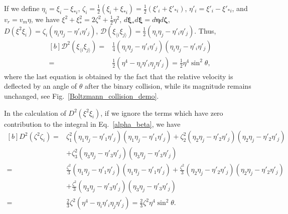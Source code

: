 If we define $\eta_i=\xi_i-\xi_{\ast {i}}$, 
$\zeta_i=\frac{1}{2}(\xi_i+\xi_{\ast {i}})=\frac{1}{2}(\xi'_i+\xi'_{\ast {i}})$,  $\eta'_i=\xi'_i-\xi'_{\ast {i}}$, 
 and $v_r=v_m\eta$, we have $\xi^2+\xi^2_{\ast}=2\zeta^2+\frac{1}{2}\eta^2$, ${d\bm{\xi}_\ast}d\bm{\xi}=d\bm{\eta}d\bm{\zeta}$,
${D}(\xi^2\xi_i)=\zeta_i(\eta_i\eta_j-\eta'_i\eta'_j)$, 
$\mathcal{D}(\xi_{\langle{i}}\xi_{j\rangle})=\frac{1}{2}(\eta_i\eta_j-\eta'_i\eta'_j)$. Thus,
\begin{equation*}
\begin{aligned}[b]
\mathcal{D}^2(\xi_{\langle{i}}\xi_{j\rangle})=&\frac{1}{4}(\eta_i\eta_j-\eta'_i\eta'_j)(\eta_i\eta_j-\eta'_i\eta'_j)\\
=&\frac{1}{2}(\eta^4-\eta_i\eta'_i\eta_j\eta'_j)=\frac{1}{2}\eta^4\sin^2\theta,
\end{aligned}
\end{equation*} 
where the last equation is obtained by the fact that the relative velocity is deflected by an angle of $\theta$ after the binary collision, while its magnitude remains unchanged, see Fig.~\ref{Boltzmann_collision_demo}. 


In the calculation of ${D}^2(\xi^2\xi_i)$, if we ignore the terms which have zero contribution to the integral in Eq.~\eqref{alpha_beta}, we have
\begin{equation*}
\begin{aligned}[b]
{D}^2(\zeta^2\zeta_i)=&\zeta^2_1(\eta_1\eta_j-\eta'_1\eta'_j)(\eta_1\eta_j-\eta'_1\eta'_j)+\zeta^2_2(\eta_2\eta_j-\eta'_2\eta'_j)(\eta_2\eta_j-\eta'_2\eta'_j)\\
&+\zeta^2_3(\eta_3\eta_j-\eta'_3\eta'_j)(\eta_3\eta_j-\eta'_3\eta'_j)\\
=&\frac{\zeta^2}{3}(\eta_1\eta_j-\eta'_1\eta'_j)(\eta_1\eta_j-\eta'_1\eta'_j)
+\frac{\zeta^2}{3}(\eta_2\eta_j-\eta'_2\eta'_j)(\eta_2\eta_j-\eta'_2\eta'_j)\\
&+\frac{\zeta^2}{3}(\eta_3\eta_j-\eta'_3\eta'_j)(\eta_3\eta_j-\eta'_3\eta'_j)\\
=&\frac{2}{3}\zeta^2(\eta^4-\eta_i\eta'_i\eta_j\eta'_j)
=\frac{2}{3}\zeta^2\eta^4\sin^2\theta.
\end{aligned}
\end{equation*} 

